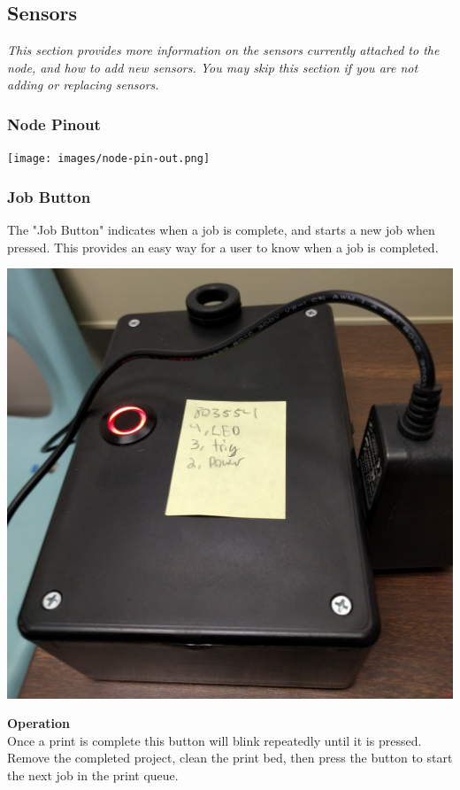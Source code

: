   \subsection{Sensors}
  \emph{This section provides more information on the sensors currently attached to the node, and 
      how to add new sensors.  You may skip this section if you are not adding or replacing sensors.}\\
  \subsubsection{Node Pinout}
  \begin{center}
        \texttt{[image: images/node-pin-out.png]}
  \end{center}
\newpage
    \subsubsection{Job Button}
      The "Job Button" indicates when a job is complete, and starts a new job when pressed. This provides an easy way
      for a user to know when a job is completed.
            \begin{center}
      \includegraphics[scale=0.1]{images/control-box.png}
\end{center}

      \textbf{Operation}\\
      Once a print is complete this button will blink repeatedly until it is pressed.  Remove the completed project,
      clean the print bed, then press the button to start the next job in the print queue.\\

